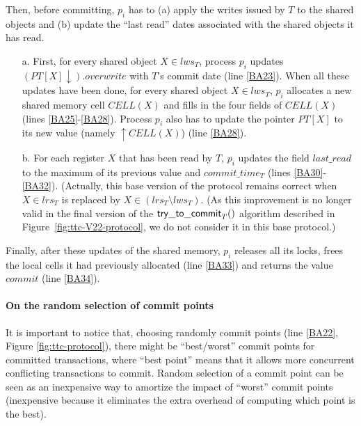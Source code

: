 Then, before committing,  $p_i$ has to (a) apply the writes issued by $T$ 
to the shared objects and (b) update the ``last read'' dates associated with 
the shared objects it has read. 
\begin{itemize}
\vspace{-0.2cm}
\item [a.] First, for every shared object $X\in lws_T$, process $p_i$ updates  
$(PT[X] \downarrow).\mathit{overwrite}$ with $T$'s 
 commit date (line \ref{BA23}). 
When all these updates have been done,  for every shared object $X\in lws_T$,
$p_i$ allocates a new shared memory cell  $CELL(X)$  and fills in the 
four fields of $CELL(X)$ (lines \ref{BA25}-\ref{BA28}).
Process $p_i$  also has to update the pointer $PT[X]$ to its new  value
(namely $\uparrow CELL(X)$)  (line \ref{BA28}). 
%
\vspace{-0.2cm}
\item[b.] For each register $X$ that has been read by $T$, 
$p_i$ updates the field $last\_read$ to the maximum of its previous value 
and $commit\_time_T$ (lines \ref{BA30}-\ref{BA32}). 
(Actually, this base version of the protocol remains correct 
when   $X \in lrs_T$  is  replaced by  $X \in (lrs_T \setminus  lws_T)$. 
(As this improvement is no longer valid in the final version of the 
${\sf try\_to\_commit}_T()$  algorithm described in  
Figure~\ref{fig:ttc-V22-protocol}, we do not consider it in this
 base protocol.) 


\end{itemize}

Finally, after these updates of the shared memory, $p_i$ releases all its 
locks, frees the local cells it had previously allocated (line \ref{BA33}) 
and returns the value $commit$ (line \ref{BA34}). 


\paragraph{On the random selection of commit points}
It is important to notice that, choosing randomly  commit points
(line \ref{BA22}, Figure \ref{fig:ttc-protocol}),  there might be 
``best/worst'' commit  points for committed  transactions,  
where ``best point''  means that it  allows  more  concurrent 
conflicting  transactions to commit.  Random selection of a commit point 
can  be seen as  an inexpensive way to amortize the impact of ``worst'' 
commit points  (inexpensive because  it eliminates the 
extra overhead of computing which point is the best). 



